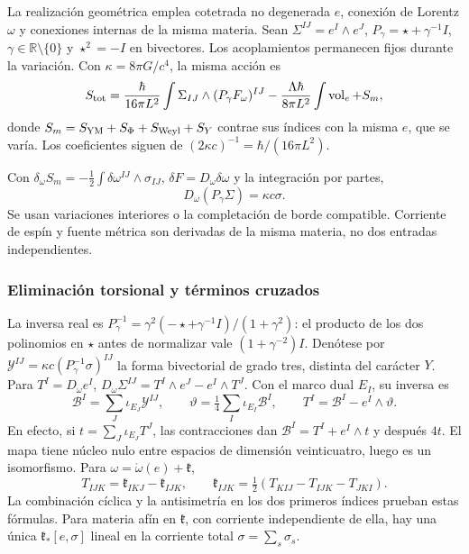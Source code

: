 La realización geométrica emplea cotetrada no degenerada $e$,
conexión de Lorentz $\omega$ y conexiones internas de la misma
materia. Sean $\Sigma^{IJ}=e^I\wedge e^J$,
$P_\gamma=\star+\gamma^{-1}I$,
$\gamma\in\mathbb R\setminus\{0\}$ y $\star^2=-I$ en bivectores.
Los acoplamientos permanecen fijos durante la variación.
Con $\kappa=8\pi G/c^4$, la misma acción es
\begin{equation}
S_{\rm tot}=\frac{\hbar}{16\pi L^2}
\int\Sigma_{IJ}\wedge(P_\gamma F_\omega)^{IJ}
-\frac{\Lambda\hbar}{8\pi L^2}\int\operatorname{vol}_e+S_m,
\label{hmtcuatro:gea:accion-total}
\end{equation}
donde $S_m=S_{\rm YM}+S_\Phi+S_{\rm Weyl}+S_Y$ contrae sus
índices con la misma $e$, que se varía.
Los coeficientes siguen de
$(2\kappa c)^{-1}=\hbar/(16\pi L^2)$.

Con $\delta_\omega S_m=-\tfrac12\int
\delta\omega^{IJ}\wedge\sigma_{IJ}$,
$\delta F=D_\omega\delta\omega$ y la integración por partes,
\begin{equation}
D_\omega(P_\gamma\Sigma)=\kappa c\sigma.
\label{hmtcuatro:gea:cartan}
\end{equation}
Se usan variaciones interiores o la completación de borde compatible.
Corriente de espín y fuente métrica son derivadas de la misma
materia, no dos entradas independientes.

\subsubsection{Eliminación torsional y términos cruzados}
\label{hmtcuatro:gea:torsion}

La inversa real es
$P_\gamma^{-1}=\gamma^2(-\star+\gamma^{-1}I)/(1+\gamma^2)$:
el producto de los dos polinomios en $\star$ antes de normalizar
vale $(1+\gamma^{-2})I$.
Denótese por $\mathcal Y^{IJ}=\kappa c(P_\gamma^{-1}\sigma)^{IJ}$
la forma bivectorial de grado tres, distinta del carácter $Y$.
Para $T^I=D_\omega e^I$,
$D_\omega\Sigma^{IJ}=T^I\wedge e^J-e^I\wedge T^J$.
Con el marco dual $E_I$, su inversa es
\[
\mathcal B^I=\sum_J\iota_{E_J}\mathcal Y^{IJ},\qquad
\vartheta=\tfrac14\sum_I\iota_{E_I}\mathcal B^I,\qquad
T^I=\mathcal B^I-e^I\wedge\vartheta.
\]
En efecto, si $t=\sum_J\iota_{E_J}T^J$, las contracciones dan
$\mathcal B^I=T^I+e^I\wedge t$ y después $4t$.
El mapa tiene núcleo nulo entre espacios de dimensión veinticuatro,
luego es un isomorfismo. Para
$\omega=\mathring\omega(e)+\mathfrak k$,
\[
T_{IJK}=\mathfrak k_{IKJ}-\mathfrak k_{IJK},\qquad
\mathfrak k_{IJK}=\tfrac12(T_{KIJ}-T_{IJK}-T_{JKI}).
\]
La combinación cíclica y la antisimetría en los dos primeros índices
prueban estas fórmulas.
Para materia afín en $\mathfrak k$, con corriente independiente
de ella, hay una única $\mathfrak k_*[e,\sigma]$ lineal en
la corriente total $\sigma=\sum_s\sigma_s$.

